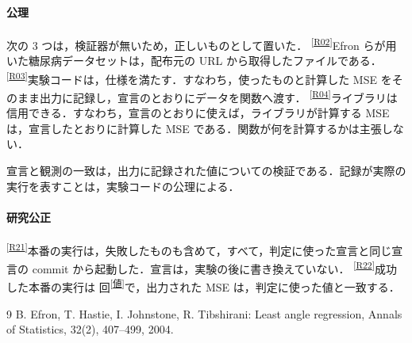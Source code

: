 \documentclass[9pt,a4paper,twocolumn]{ltjsarticle}
\newcommand{\schemaurl}{https://github.com/auto-res2/formal-first-diabetes-regression-4/blob/\SchemaCommit/formal/claims.json}
\newcommand{\cid}[1]{\textsuperscript{\textsf{\scriptsize[\href{\schemaurl\#L\csname line#1\endcsname}{#1}]}}}
\newcommand{\val}[1]{\textsuperscript{\textsf{\scriptsize[\href{\schemaurl\#L\csname line#1\endcsname}{値}]}}}
\begin{document}
\paragraph{公理}
次の 3 つは，検証器が無いため，正しいものとして置いた．
\cid{R02}Efron らが用いた糖尿病データセットは，配布元の URL から取得したファイルである．
\cid{R03}実験コードは，仕様を満たす．すなわち，使ったものと計算した MSE をそのまま出力に記録し，宣言のとおりにデータを関数へ渡す．
\cid{R04}ライブラリは信用できる．すなわち，宣言のとおりに使えば，ライブラリが計算する MSE は，宣言したとおりに計算した MSE である．関数が何を計算するかは主張しない．

宣言と観測の一致は，出力に記録された値についての検証である．記録が実際の実行を表すことは，実験コードの公理による．

\paragraph{研究公正}
\cid{R21}本番の実行は，失敗したものも含めて，すべて，判定に使った宣言と同じ宣言の commit から起動した．宣言は，実験の後に書き換えていない．
\cid{R22}成功した本番の実行は \NFullRuns{} 回\val{fullRunTestMses}で，出力された MSE は，判定に使った値と一致する．

\begin{thebibliography}{9}
\small
{} B. Efron, T. Hastie, I. Johnstone, R. Tibshirani: Least angle regression, Annals of Statistics, 32(2), 407--499, 2004.
\end{thebibliography}
\end{document}
